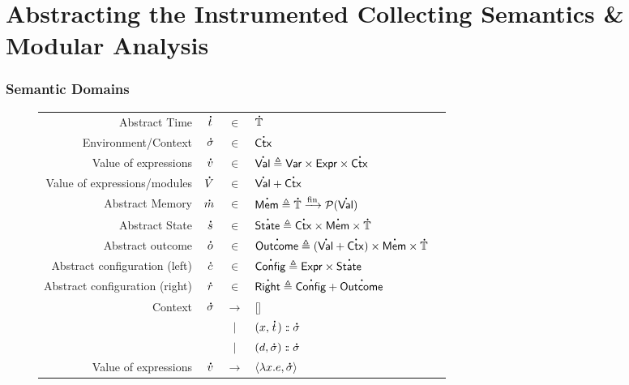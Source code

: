 \documentclass{beamer}
\theoremstyle{definition}
\newcommand*{\vbar}{|}
\newcommand*{\cons}{:{\hspace{-0.7em}}:}
\newcommand*{\pset}{\mathcal{P}}
\newcommand*{\A}[1]{\overset{\,_{\mbox{\Large .}}}{#1}}
\newcommand*{\Expr}{\mathsf{Expr}}
\newcommand*{\ExprVar}{\mathsf{Var}}
\newcommand*{\modid}{d}
\newcommand*{\Time}{\mathbb{T}}
\newcommand*{\ctx}{\sigma}
\newcommand*{\Ctx}{\mathsf{Ctx}}
\newcommand*{\Value}{\mathsf{Val}}
\newcommand*{\Mem}{\mathsf{Mem}}
\newcommand*{\mem}{m}
\newcommand*{\Config}{\mathsf{Config}}
\newcommand*{\config}{c}
\newcommand*{\Right}{\mathsf{Right}}
\newcommand*{\rightst}{r}
\newcommand*{\State}{\mathsf{State}}
\newcommand*{\Outcome}{\mathsf{Outcome}}
\newcommand*{\fin}[2]{{#1}\xrightarrow{\text{fin}}{#2}}
\begin{document}
\section{Abstracting the Instrumented Collecting Semantics \&\\ Modular Analysis}
\begin{frame}[c]
  \frametitle{Semantic Domains}
  \begin{figure}[h!]
    \footnotesize
    \centering
    \begin{tabular}{rrcll}
      Abstract Time                  & $\A{t}$        & $\in$         & $\A{\Time}$                                                                 \\
      Environment/Context            & $\A{\ctx}$     & $\in$         & $\A{\Ctx}$                                                                  \\
      Value of expressions           & $\A{v}$        & $\in$         & $\A{\Value} \triangleq \ExprVar\times\Expr\times\A{\Ctx}$                   \\
      Value of expressions/modules   & $\A{V}$        & $\in$         & $\A{\Value}+\A{\Ctx}$                                                       \\
      Abstract Memory                & $\A{\mem}$     & $\in$         & $\A{\Mem} \triangleq \fin{\A{\Time}}{\pset(\A{\Value})}$                    \\
      Abstract State                 & $\A{s}$        & $\in$         & $\A{\State} \triangleq \A{\Ctx}\times\A{\Mem}\times\A{\Time}$               \\
      Abstract outcome               & $\A{o}$        & $\in$         & $\A{\Outcome} \triangleq(\A{\Value}+\A{\Ctx})\times\A{\Mem}\times\A{\Time}$ \\
      Abstract configuration (left)  & $\A{\config}$  & $\in$         & $\A{\Config}\triangleq\Expr\times\A{\State}$                                \\
      Abstract configuration (right) & $\A{\rightst}$ & $\in$         & $\A{\Right}\triangleq\A{\Config}+\A{\Outcome}$                              \\
      Context                        & $\A{\ctx}$     & $\rightarrow$ & []                                                                          \\
                                     &                & $\vbar$       & $(x,\A{t})\cons \A{\ctx}$                                                   \\
                                     &                & $\vbar$       & $(\modid,\A{\ctx})\cons \A{\ctx}$                                           \\
      Value of expressions           & $\A{v}$        & $\rightarrow$ & $\langle \lambda x.e, \A{\ctx} \rangle$
    \end{tabular}
  \end{figure}
\end{frame}
\end{document}
